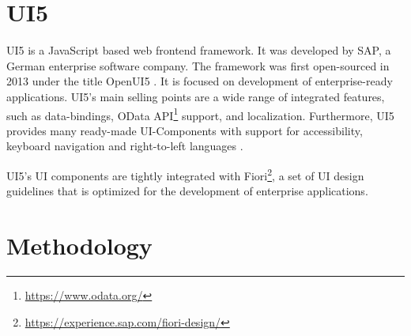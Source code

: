 



\section{UI5}
UI5 is a JavaScript based web frontend framework. It was developed by SAP, a German enterprise software company. The framework was first open-sourced in 2013 under the title OpenUI5 \cite{kurz_brief_2020}. It is focused on development of enterprise-ready applications. UI5's main selling points are a wide range of integrated features, such as data-bindings, OData API\footnote{\url{https://www.odata.org/}} support, and localization. Furthermore, UI5 provides many ready-made UI-Components with support for accessibility, keyboard navigation and right-to-left languages \cite{kunz_what_2013}.   

UI5's UI components are tightly integrated with Fiori\footnote{\url{https://experience.sap.com/fiori-design/}}, a set of UI design guidelines that is optimized for the development of enterprise applications.

\section{Methodology}
\label{sec:methodology}


